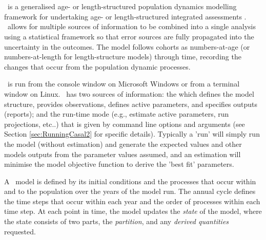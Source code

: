 \section{\label{sec:Overview}}

\CNAME\ is a generalised age- or length-structured population dynamics modelling framework for undertaking age- or length-structured integrated assessments \citep{Maunder_2013}. \CNAME\ allows for multiple sources of information to be combined into a single analysis using a statistical framework so that error sources are fully propagated into the uncertainty in the outcomes. The model follows cohorts as numbers-at-age (or numbers-at-length for length-structure models) through time, recording the changes that occur from the population dynamic processes.

\CNAME\ is run from the console window on Microsoft Windows or from a terminal window on Linux. \CNAME\ has two sources of information: the \emph{\config} which  defines the model structure, provides observations, defines active parameters, and specifies outputs (reports); and the run-time mode (e.g., estimate active parameters, run projections, etc..) that is given by command line options and arguments (see Section \ref{sec:RunningCasal2} for specific details). Typically a 'run' will simply run the model (without estimation) and generate the expected values and other models outputs from the parameter values assumed, and an estimation will minimise the model objective function to derive the 'best fit' parameters.

A \CNAME\ model is defined by its initial conditions and the processes that occur within and to the population over the years of the model run. The annual cycle defines the time steps that occur within each year and the order of processes within each time step. At each point in time, the model updates the \emph{state} of the model, where the state consists of two parts, the \emph{partition}, and any \emph{derived quantities} requested.


